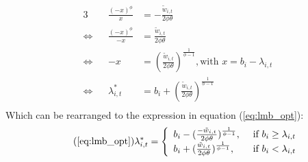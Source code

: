 \documentclass[../main.tex]{subfiles}
\begin{document}
\begin{alignat*}{3}
	{}				&& \frac{(-x)^\phi}{x} 					&= - \frac{\tilde{w}_{i,t}}{2 \phi \theta} \\
	\Leftrightarrow && \frac{(-x)^\phi}{-x} 				&= \frac{\tilde{w}_{i,t}}{2 \phi \theta} \\
	\Leftrightarrow && - x 									&= (\frac{\tilde{w}_{i,t}}{2 \phi \theta})^\frac{1}{\phi-1}, \text{with $x = b_i - \lambda_{i,t}$} \\
	\Leftrightarrow && \lambda^*_{i,t}						&= b_i + (\frac{\tilde{w}_{i,t}}{2 \phi \theta})^\frac{1}{\phi-1} \\
\end{alignat*}
Which can be rearranged to the expression in equation (\ref{eq:lmb_opt}):
\begin{equation} \tag{\ref{eq:lmb_opt}}
	\lambda^*_{i,t} = \left\{
	\begin{array}{ll}
		b_i - (\frac{- \tilde{w}_{i,t}}{2 \phi \theta})^{\frac{1}{\phi -1}}, \: & \: \text{if $b_i \geq \lambda_{i,t}$}\\
		b_i + (\frac{\tilde{w}_{i,t}}{2 \phi \theta})^{\frac{1}{\phi - 1}}, \: & \: \text{if $b_i < \lambda_{i,t}$}
	\end{array}
\right.
\end{equation}
\end{document}
